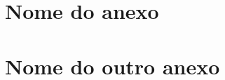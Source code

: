 
\begin{anexosenv}
\partanexos

\chapter{Nome do anexo}     %
\label{chap:anexoA}

\chapter{Nome do outro anexo}
\label{chap:anexoB}


\end{anexosenv}
